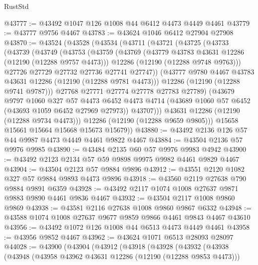\begin{lexlean}{RustStd}
\begin{coremodule}
@43777 := @43492 @1047 @126 @1008 @44 @6412 @4473 @4449 @4461
@43779 := @43777 @9756 @4467
@43783 := @43624 @1046 @6412 @27904 @27908
@43870 := @43524
    (@43528
      (@43534
        (@43711
          (@43721
            (@43725
              (@43733
                (@43739
                  (@43749
                    (@43753
                      (@43759
                        (@43769
                          (@43779 @43783 @43631 @12286 (@12190 (@12288 @9757 @4473)))
                          @12286
                          (@12190 (@12288 @9748 @9763)))
                        @27726
                        @27729
                        @27732
                        @27736
                        @27741
                        @27747))
                    (@43777 @9780 @4467 @43783 @43631 @12286 (@12190 (@12288 @9781 @4473)))
                    @12286
                    (@12190 (@12288 @9741 @9787)))
                  @27768
                  @27771
                  @27774
                  @27778
                  @27783
                  @27789)
                (@43679
                  @9797
                  @1060
                  @327
                  @57
                  @4473
                  @6452
                  @4473
                  @4714
                  (@43689 @1060 @57 @6452 (@43693 @1059 @6452 @27969 @27973))
                  @43707)))
            @43631
            @12286
            (@12190 (@12288 @9734 @4473)))
          @12286
          (@12190 (@12288 @9659 @9805)))
        @15658
        @15661
        @15664
        @15668
        @15673
        @15679))
@43880 := @43492 @2136 @126 @57 @44 @9987 @4473 @4449 @4461 @9822 @4467
@43884 := @43504 @2136 @57 @9976 @9985
@43890 := @43484 @2135 @60 @57 @9976 @9983 @4942
@43900 := @43492 @2123 @2134 @57 @59 @9898 @9975 @9982 @4461 @9829 @4467
@43904 := @43504 @2123 @57 @9884 @9896
@43912 := @43551 @2120 @1082 @327 @57 @9884 @9893 @4473 @9896
@43918 := @43560 @2119 @27638 @790 @9884 @9891 @6359
@43928 := @43492 @2117 @1074 @1008 @27637 @9871 @9883 @9890 @4461 @9836 @4467
@43932 := @43504 @2117 @1008 @9860 @9869
@43938 := @43581 @2116 @27638 @1008 @9860 @9867 @6332
@43948 := @43588 @1074 @1008 @27637 @9677 @9859 @9866 @4461 @9843 @4467 @43610
@43956 := @43492 @1072 @126 @1008 @44 @6513 @4473 @4449 @4461
@43958 := @43956 @9852 @4467
@43962 := @43624 @1071 @6513 @28093 @28097
@44028 := @43900
    (@43904
      (@43912
        (@43918
          (@43928
            (@43932
              (@43938
                (@43948
                  (@43958 @43962 @43631 @12286 (@12190 (@12288 @9853 @4473)))

\end{coremodule}
\end{lexlean}
